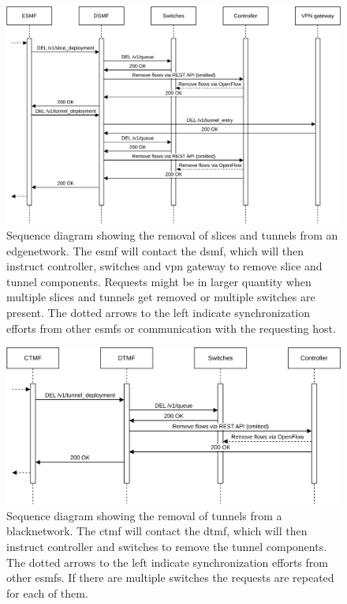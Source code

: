 \begin{figure}[H]
    \centering
    \includegraphics[width=\linewidth]{images/chapter_6/slice_removal_edge.png}
    \caption[Slice removal from an \gls{edgenetwork}]{Sequence diagram showing the removal of slices and tunnels from an \gls{edgenetwork}. The \acrshort{esmf} will contact the \acrshort{dsmf}, which will then instruct controller, switches and \acrshort{vpn} gateway to remove slice and tunnel components. Requests might be in larger quantity when multiple slices and tunnels get removed or multiple switches are present. The dotted arrows to the left indicate synchronization efforts from other \acrshort{esmf}s or communication with the requesting host.}
    \label{fig:slice_removal_edge}
\end{figure}
\begin{figure}[H]
    \centering
    \includegraphics[width=\linewidth]{images/chapter_6/slice_removal_bn.png}
    \caption[Slice removal from a \gls{blacknetwork}]{Sequence diagram showing the removal of tunnels from a \gls{blacknetwork}. The \acrshort{ctmf} will contact the \acrshort{dtmf}, which will then instruct controller and switches to remove the tunnel components. The dotted arrows to the left indicate synchronization efforts from other \acrshort{esmf}s. If there are multiple switches the requests are repeated for each of them.}
    \label{fig:slice_removal_bn}
\end{figure}

